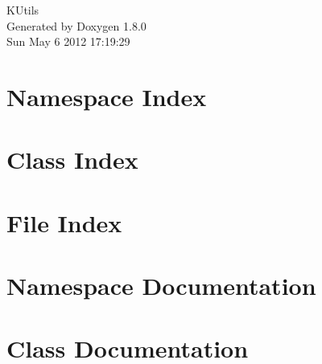 \documentclass{book}
\begin{document}
\hypersetup{pageanchor=false,citecolor=blue}
\begin{titlepage}
\vspace*{7cm}
\begin{center}
{\Large K\-Utils }\\
\vspace*{1cm}
{\large Generated by Doxygen 1.8.0}\\
\vspace*{0.5cm}
{\small Sun May 6 2012 17:19:29}\\
\end{center}
\end{titlepage}
\clearemptydoublepage
{}
\tableofcontents
\clearemptydoublepage
{}
\hypersetup{pageanchor=true,citecolor=blue}
\chapter{Namespace Index}

\chapter{Class Index}

\chapter{File Index}

\chapter{Namespace Documentation}























\chapter{Class Documentation}


















\end{document}
